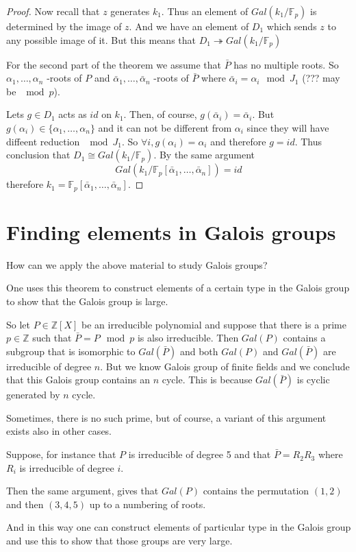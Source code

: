 \begin{theorem}
\begin{proof}
    Now recall that $z$ generates $k_1$. Thus an element of
    $Gal\left(k_1/\mathbb{F}_p\right)$ is determined by the image of
    $z$. And we have an element of $D_1$ which sends $z$ to any
    possible image of it. But this means that
    \(
    D_1 \twoheadrightarrow
    Gal\left(k_1/\mathbb{F}_p\right)
    \)

    For the second part of the theorem we assume that $\bar{P}$ has no
    multiple roots. So $\alpha_1, \dots, \alpha_n$ -roots of $P$ and
    $\bar{\alpha}_1, \dots, \bar{\alpha}_n$ -roots of $\bar{P}$ where
    $\bar{\alpha}_i = \alpha_i \mod J_1$ (??? may be $\mod p$).

    Lets $g \in D_1$ acts as $id$ on $k_1$. Then, of course,
    $g\left(\bar{\alpha}_i\right) = \bar{\alpha}_i$.
    But $g\left(\alpha_i\right) \in \{\alpha_1, \dots, \alpha_n\}$ and
    it can not be different from $\alpha_i$ since they will have
    diffeent reduction $\mod J_1$. So
    $\forall i,  g\left(\alpha_i\right) = \alpha_i$ and therefore $g =
    id$. Thus conclusion that $D_1 \cong
    Gal\left(k_1/\mathbb{F}_p\right)$. By the same argument
    \[
    Gal\left(k_1/\mathbb{F}_p\left[\bar{\alpha}_1,
      \dots, \bar{\alpha}_n\right]\right) = id
    \]
    therefore
    $k_1 = \mathbb{F}_p\left[\bar{\alpha}_1,
      \dots, \bar{\alpha}_n\right]$.
  \end{proof}
  \label{thm:lec9_2}
\end{theorem}

\section{Finding elements in Galois groups}
How can we apply the above material to study Galois groups?

One uses this theorem to construct elements of a certain type in the
Galois group to show that the Galois group is large.

So let $P \in \mathbb{Z}\left[X\right]$ be an
irreducible polynomial and suppose that there is a prime
$p \in \mathbb{Z}$ such that $\bar{P} = P \mod p$ is also irreducible.
Then $Gal\left(P\right)$ contains a subgroup that is isomorphic to 
$Gal\left(\bar{P}\right)$ and both
$Gal\left(P\right)$ and $Gal\left(\bar{P}\right)$ are
irreducible of degree $n$. But we know Galois group of finite fields
and we conclude that this Galois group contains an $n$ cycle.
This is because $Gal\left(\bar{P}\right)$ is cyclic generated by $n$ cycle.

Sometimes, there is no such prime, but of course, a variant of this
argument exists also in other cases.

Suppose, for instance that $P$ is irreducible of degree 5 and that
$\bar{P} = R_2 R_3$ where $R_i$ is irreducible of degree $i$.


Then the same argument, gives that
$Gal\left(P\right)$ contains the permutation $(1,2)$ and then
$(3,4,5)$ up to a numbering of roots.

And in this way one can construct elements of particular type in the
Galois group and use this to show that those groups are very large.  
